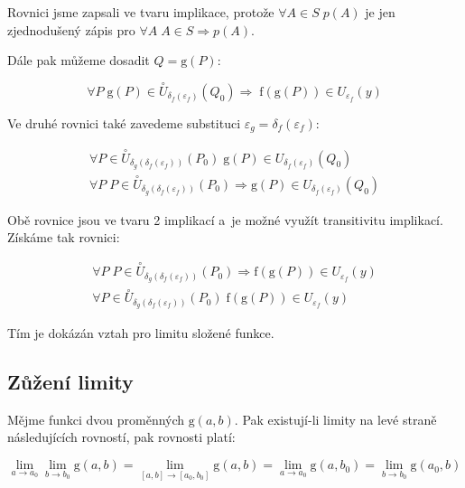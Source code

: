 Rovnici jsme zapsali ve tvaru implikace, protože \(\forall A \in S \; p(A)\) je jen zjednodušený zápis pro \(\forall A \; A \in S \Rightarrow p(A)\). 

Dále pak můžeme dosadit \(Q = \mathrm{g}(P)\):

\begin{equation}
\forall P \; \mathrm{g}(P) \in \overset{\circ}{U}_{\delta_f(\varepsilon_f)}(Q_0) \Rightarrow \; \mathrm{f}(\mathrm{g}(P)) \in U_{\varepsilon_f}(y)
\end{equation}

Ve druhé rovnici také zavedeme substituci \(\varepsilon_g = \delta_f(\varepsilon_f)\):

\begin{equation}
\begin{split}
\forall P \in \overset{\circ}{U}_{\delta_g(\delta_f(\varepsilon_f))}(P_0) \; \mathrm{g}(P) \in U_{\delta_f(\varepsilon_f)}(Q_0) \\
\forall P \; P \in \overset{\circ}{U}_{\delta_g(\delta_f(\varepsilon_f))}(P_0) \Rightarrow \mathrm{g}(P) \in U_{\delta_f(\varepsilon_f)}(Q_0)
\end{split}
\end{equation}

Obě rovnice jsou ve tvaru 2 implikací a~je možné využít transitivitu implikací. Získáme tak rovnici:

\begin{equation}
\begin{split}
\forall P \; P \in \overset{\circ}{U}_{\delta_g(\delta_f(\varepsilon_f))}(P_0) \Rightarrow \mathrm{f}(\mathrm{g}(P)) \in U_{\varepsilon_f}(y) \\
\forall P \in \overset{\circ}{U}_{\delta_g(\delta_f(\varepsilon_f))}(P_0) \; \mathrm{f}(\mathrm{g}(P)) \in U_{\varepsilon_f}(y)
\end{split}
\end{equation}

Tím je dokázán vztah pro limitu složené funkce.

\subsection{Zůžení limity}

Mějme funkci dvou proměnných \(\mathrm{g}(a, b)\). Pak existují-li limity na levé straně následujících rovností, pak rovnosti platí:

\begin{equation}
\label{eq:zuzeni_limity_fixace}
\lim_{a \to a_0} \lim_{b \to b_0} \mathrm{g}(a, b) = \lim_{[a, b] \to [a_0, b_0]} \mathrm{g}(a, b) = \lim_{a \to a_0} \mathrm{g}(a, b_0) = \lim_{b \to b_0} \mathrm{g}(a_0, b)
\end{equation}

